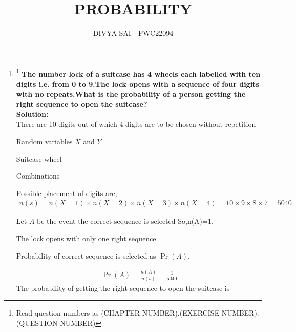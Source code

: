 \documentclass{article}
\providecommand{\pr}[1]{\ensuremath{\Pr\left(#1\right)}}
\newcommand{\solution}{\noindent \textbf{Solution: }}
\begin{document}
\title{PROBABILITY}
\author{\Large DIVYA SAI - FWC22094}
\date{}

\maketitle
\begin{enumerate}[label=16.\arabic{enumi}.\arabic{enumii}]%
\setcounter{enumi}{3}
\setcounter{enumii}{10}

\item \footnote{Read question numbers as (CHAPTER NUMBER).(EXERCISE NUMBER).(QUESTION NUMBER)}
\textbf {The number lock of a suitcase has 4 wheels each labelled with ten digits i.e. from 0 to 9.The lock opens with a sequence of four digits with no repeats.What is the probability of a person getting the right sequence to open the suitcase?}\\[1ex]

\solution\\
There are 10 digits out of which 4 digits are to be chosen without repetition
\begin{table}[h]
	
	 \caption{Random variables $X$ and $Y$}\label{table:1}
\end{table}

\begin{table}[h]
	
	 \caption{Suitcase wheel}\label{table:2}
\end{table}

\begin{table}[h]
	
 \caption{Combinations}\label{table:3}
\end{table}

Possible placement of digits are,
\begin{align}
n(s)=n(X=1) \times n(X=2) \times n(X=3) \times n(X=4)
=10 \times 9 \times 8 \times 7 = 5040 
\end{align}

Let $A$ be the event the correct sequence is selected So,n(A)=1.

The lock opens with only one right sequence.

Probability of correct sequence is selected as $\pr{A}$,

\begin{align}
\pr{A}=\frac{n(A)}{n(s)}=\frac{1}{5040}
\end{align}
The probability of getting the right sequence to open the suitcase is 
\end{enumerate}
\end{document}
